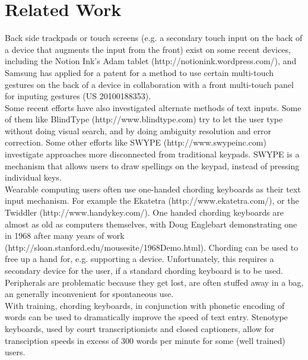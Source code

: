 \section{Related Work}
Back side trackpads or touch screens (e.g. a secondary touch input on the back of a device that augments the input from the front) exist on some recent devices, including the Notion Ink’s Adam tablet (http://notionink.wordpress.com/), and Samsung has applied for a patent for a method to use certain multi-touch gestures on the back of a device in collaboration with a front multi-touch panel for inputing gestures (US 20100188353).\\
Some recent efforts have also investigated alternate methods of text inputs. Some of them like BlindType (http://www.blindtype.com) try to let the user type without doing visual search, and by doing ambiguity resolution and error correction. Some other efforts like SWYPE (http://www.swypeinc.com) investigate approaches more disconnected from traditional keypads. SWYPE is a mechanism that allows users to draw spellings on the keypad, instead of pressing individual keys.\\ 
Wearable computing users often use one-handed chording keyboards as their text input mechanism.  For example the Ekatetra (http://www.ekatetra.com/), or the Twiddler (http://www.handykey.com/).  One handed chording keyboards are almost as old as computers themselves, with Doug Englebart demonstrating one in 1968 after many years of work (http://sloan.stanford.edu/mousesite/1968Demo.html).   Chording can be used to free up a hand for, e.g. supporting a device.  Unfortunately, this requires a secondary device for the user, if a standard chording keyboard is to be used.  Peripherals are problematic because they get lost, are often stuffed away in a bag, an generally inconvenient for spontaneous use.\\
With training, chording keyboards, in conjunction with phonetic encoding of words can be used to dramatically improve the speed of text entry.  Stenotype keyboards, used by court transcriptionists and closed captioners, allow for transciption speeds in excess of 300 words per minute for some (well trained) users.

